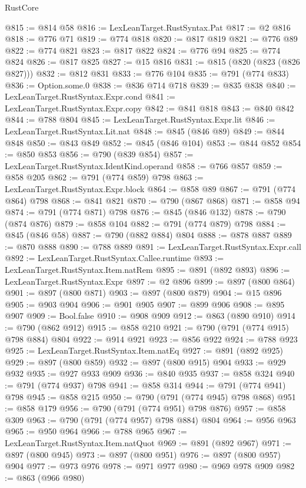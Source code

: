 \begin{lexlean}{RustCore}
\begin{coremodule}
@815 := @814 @58
@816 := LexLeanTarget.RustSyntax.Pat
@817 := @2 @816
@818 := @776 @71
@819 := @774 @818
@820 := @817 @819
@821 := @776 @89
@822 := @774 @821
@823 := @817 @822
@824 := @776 @94
@825 := @774 @824
@826 := @817 @825
@827 := @15 @816
@831 := @815 (@820 (@823 (@826 @827)))
@832 := @812 @831
@833 := @776 @104
@835 := @791 (@774 @833)
@836 := Option.some.{0}
@838 := @836 @714 @718
@839 := @835 @838
@840 := LexLeanTarget.RustSyntax.Expr.cond
@841 := LexLeanTarget.RustSyntax.Expr.copy
@842 := @841 @818
@843 := @840 @842
@844 := @788 @804
@845 := LexLeanTarget.RustSyntax.Expr.lit
@846 := LexLeanTarget.RustSyntax.Lit.nat
@848 := @845 (@846 @89)
@849 := @844 @848
@850 := @843 @849
@852 := @845 (@846 @104)
@853 := @844 @852
@854 := @850 @853
@856 := @790 (@839 @854)
@857 := LexLeanTarget.RustSyntax.IdentKind.operand
@858 := @766 @857
@859 := @858 @205
@862 := @791 (@774 @859) @798
@863 := LexLeanTarget.RustSyntax.Expr.block
@864 := @858 @89
@867 := @791 (@774 @864) @798
@868 := @841 @821
@870 := @790 (@867 @868)
@871 := @858 @94
@874 := @791 (@774 @871) @798
@876 := @845 (@846 @132)
@878 := @790 (@874 @876)
@879 := @858 @104
@882 := @791 (@774 @879) @798
@884 := @845 (@846 @58)
@887 := @790 (@882 @884) @804
@888 := @878 @887
@889 := @870 @888
@890 := @788 @889
@891 := LexLeanTarget.RustSyntax.Expr.call
@892 := LexLeanTarget.RustSyntax.Callee.runtime
@893 := LexLeanTarget.RustSyntax.Item.natRem
@895 := @891 (@892 @893)
@896 := LexLeanTarget.RustSyntax.Expr
@897 := @2 @896
@899 := @897 (@800 @864)
@901 := @897 (@800 @871)
@903 := @897 (@800 @879)
@904 := @15 @896
@905 := @903 @904
@906 := @901 @905
@907 := @899 @906
@908 := @895 @907
@909 := Bool.false
@910 := @908 @909
@912 := @863 (@890 @910)
@914 := @790 (@862 @912)
@915 := @858 @210
@921 := @790 (@791 (@774 @915) @798 @884) @804
@922 := @914 @921
@923 := @856 @922
@924 := @788 @923
@925 := LexLeanTarget.RustSyntax.Item.natEq
@927 := @891 (@892 @925)
@929 := @897 (@800 @859)
@932 := @897 (@800 @915) @904
@933 := @929 @932
@935 := @927 @933 @909
@936 := @840 @935
@937 := @858 @324
@940 := @791 (@774 @937) @798
@941 := @858 @314
@944 := @791 (@774 @941) @798
@945 := @858 @215
@950 := @790 (@791 (@774 @945) @798 @868)
@951 := @858 @179
@956 := @790 (@791 (@774 @951) @798 @876)
@957 := @858 @309
@963 := @790 (@791 (@774 @957) @798 @884) @804
@964 := @956 @963
@965 := @950 @964
@966 := @788 @965
@967 := LexLeanTarget.RustSyntax.Item.natQuot
@969 := @891 (@892 @967)
@971 := @897 (@800 @945)
@973 := @897 (@800 @951)
@976 := @897 (@800 @957) @904
@977 := @973 @976
@978 := @971 @977
@980 := @969 @978 @909
@982 := @863 (@966 @980)

\end{coremodule}
\end{lexlean}
